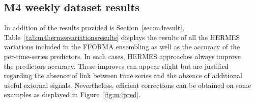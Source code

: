 \documentclass[10pt]{article} %
\begin{document}
\subsection{M4 weekly dataset results}

In addition of the results provided is Section~\ref{sec:m4result}, Table~\ref{tab:m4hermesvariationsresults} displays the results of all the HERMES variations included in the FFORMA ensembling as well as the accuracy of the per-time-series predictors. In each cases, HERMES approaches always improve the predictors accuracy. These improves can appear slight but are justified regarding the absence of link between time series and the absence of additional useful external signals. Nevertheless, efficient corrections can be obtained on some examples as displayed in Figure~\ref{fig:m4pred}.

\begin{table}
  \caption{Results summary on the m4 weekly dataset of the HERMES variations. For each metric, the average on all the time series is computed. For approaches using a neural network, 10 models are trained with different seeds. The mean and the standard deviation of the 10 results are displayed. For the statistical models \textit{ets-add}, \textit{ets-mul} and \textit{thetam}, the Python package {\texttt{statsmodels}} is used. The Python package \texttt{tbats} is used for the \textit{tbats} approach.}
  \centering
\label{tab:m4hermesvariationsresults}
\end{table}
\end{document}
